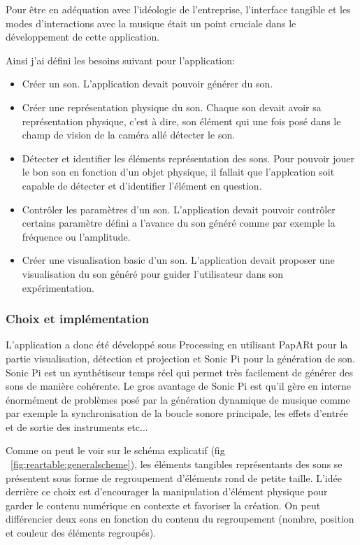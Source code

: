 Pour être en adéquation avec l'idéologie de l'entreprise, l'interface tangible et les modes d'interactions avec la musique était un point cruciale dans le développement de cette application.

Ainsi j'ai défini les besoins suivant pour l'application:
\begin{itemize}
\item Créer un son. L'application devait pouvoir générer du son.
\item Créer une représentation physique du son. Chaque son devait avoir sa représentation physique, c'est à dire, son élément qui une fois posé dans le champ de vision de la caméra allé détecter le son.
\item Détecter et identifier les éléments représentation des sons. Pour pouvoir jouer le bon son en fonction d'un objet physique, il fallait que l'applcation soit capable de détecter et d'identifier l'élément en question.
\item Contrôler les paramètres d'un son. L'application devait pouvoir contrôler certains paramètre défini a l'avance du son généré comme par exemple la fréquence ou l'amplitude.
\item Créer une visualisation basic d'un son. L'application devait proposer une visualisation du son généré pour guider l'utilisateur dans son expérimentation.
\end{itemize}

\subsubsection{Choix et implémentation}
L'application a donc été développé sous Processing en utilisant PapARt pour la partie visualisation, détection et projection et Sonic Pi pour la génération de son.
Sonic Pi est un synthétiseur temps réel qui permet très facilement de générer des sons de manière cohérente. Le gros avantage de Sonic Pi est qu'il gère en interne énormément de problèmes posé par la génération dynamique de musique comme par exemple la synchronisation de la boucle sonore principale, les effets d'entrée et de sortie des instruments etc...

Comme on peut le voir sur le schéma explicatif (fig ~\ref{fig:reartable:generalscheme}), les éléments tangibles représentants des sons se présentent sous forme de regroupement d'éléments rond de petite taille. L'idée derrière ce choix est d'encourager la manipulation d'élément physique pour garder le contenu numérique en contexte et favoriser la création. On peut différencier deux sons en fonction du contenu du regroupement (nombre, position et couleur des éléments regroupés).

